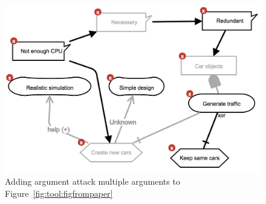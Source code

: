 \begin{figure}[ht]
\centering
\includegraphics[scale=0.6]{img/tool-multipleattack}
\caption{Adding argument attack multiple arguments to Figure~\ref{fig:tool:figfrompaper}}
\label{fig:tool:multipleattack}
\end{figure}